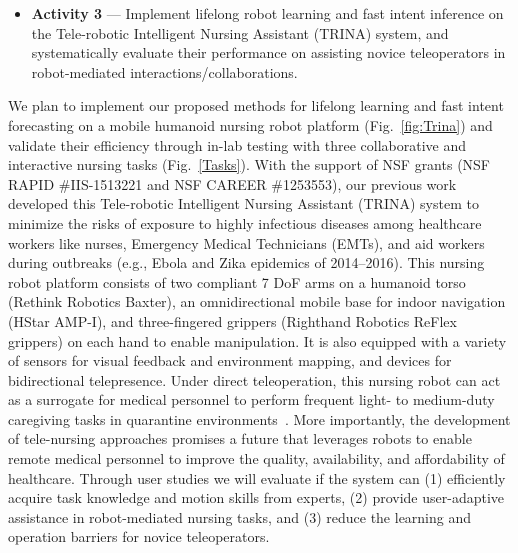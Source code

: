\documentclass[letterpaper, 11 pt, onecolumn]{article}
\newcommand{\fig}[1]{Fig.~\ref{#1}}
\begin{document}
\begin{itemize}
\item \textbf{Activity 3} --- Implement lifelong robot learning and fast intent inference on the Tele-robotic Intelligent Nursing Assistant (TRINA) system, and systematically evaluate their performance on assisting novice teleoperators in robot-mediated interactions/collaborations. 

\end{itemize}

\noindent
We plan to implement our proposed methods for lifelong learning and fast intent forecasting on a mobile humanoid nursing robot platform (\fig{fig:Trina}) and validate their efficiency through in-lab testing with three collaborative and interactive nursing tasks (\fig{Tasks}). With the support of NSF grants (NSF RAPID \#IIS-1513221 and NSF CAREER \#1253553), our previous work developed this Tele-robotic Intelligent Nursing Assistant (TRINA) system to minimize the risks of exposure to highly infectious diseases among healthcare workers like nurses, Emergency Medical Technicians (EMTs), and aid workers during outbreaks (e.g., Ebola and Zika epidemics of 2014--2016). This nursing robot platform consists of two compliant 7 DoF arms on a humanoid torso (Rethink Robotics Baxter), an omnidirectional mobile base for indoor navigation (HStar AMP-I), and three-fingered grippers (Righthand Robotics ReFlex grippers) on each hand to enable manipulation. It is also equipped with a variety of sensors for visual feedback and environment mapping, and devices for bidirectional telepresence. Under direct teleoperation, this nursing robot can act as a surrogate for medical personnel to perform frequent light- to medium-duty caregiving tasks in quarantine environments~\cite{Hauser_Li_TRINA:17}. More importantly, the development of tele-nursing approaches promises a future that leverages robots to enable remote medical personnel to improve the quality, availability, and affordability of healthcare. Through user studies we will evaluate if the system can (1) efficiently acquire task knowledge and motion skills from experts, (2) provide user-adaptive assistance in robot-mediated nursing tasks, and (3) reduce the learning and operation barriers for novice teleoperators. 


\end{document}
